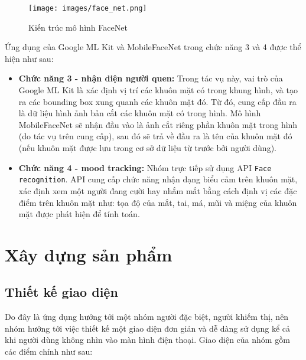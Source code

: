 \documentclass[a4paper,12pt]{article}
\begin{document}
\begin{figure}[H]
    \centering
    \texttt{[image: images/face\_net.png]}
    \caption{Kiến trúc mô hình FaceNet}
    \label{fig:enter-label}
\end{figure}

Ứng dụng của Google ML Kit và MobileFaceNet trong chức năng 3 và 4 được thể hiện như sau:
\begin{itemize}
    \item \textbf{Chức năng 3 - nhận diện người quen:} Trong tác vụ này, vai trò của Google ML Kit là xác định vị trí các khuôn mặt có trong khung hình, và tạo ra các bounding box xung quanh các khuôn mặt đó. Từ đó, cung cấp đầu ra là dữ liệu hình ảnh bản cắt các khuôn mặt có trong hình. Mô hình MobileFaceNet sẽ nhận đầu vào là ảnh cắt riêng phần khuôn mặt trong hình (do tác vụ trên cung cấp), sau đó sẽ trả về đầu ra là tên của khuôn mặt đó (nếu khuôn mặt được lưu trong cơ sở dữ liệu từ trước bởi người dùng).
    \item \textbf{Chức năng 4 - mood tracking:} Nhóm trực tiếp sử dụng API \texttt{Face recognition}. API cung cấp chức năng nhận dạng biểu cảm trên khuôn mặt, xác định xem một người đang cười hay nhắm mắt bằng cách định vị các đặc điểm trên khuôn mặt như: tọa độ của mắt, tai, má, mũi và miệng của khuôn mặt được phát hiện để tính toán.
\end{itemize}

\section{Xây dựng sản phẩm}

\subsection{Thiết kế giao diện}

Do đây là ứng dụng hướng tới một nhóm người đặc biệt, người khiếm thị, nên nhóm hướng tới việc thiết kế một giao diện đơn giản và dễ dàng sử dụng kể cả khi người dùng không nhìn vào màn hình điện thoại. Giao diện của nhóm gồm các điểm chính như sau:
\end{document}
